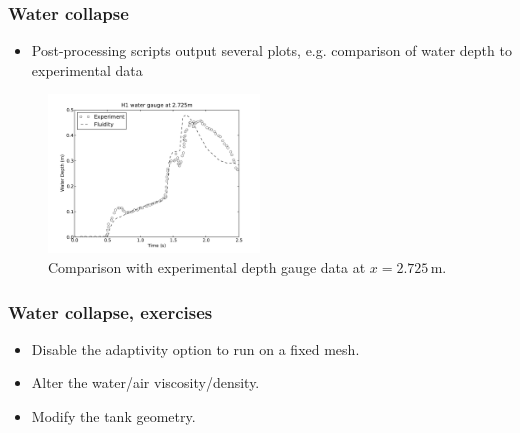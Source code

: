 %
\begin{frame}
    \frametitle{Water collapse}
\begin{itemize}
\item Post-processing scripts output several plots, e.g. comparison of water depth to experimental data
\end{itemize}
\begin{figure}
\centering
\includegraphics[width=0.5\textwidth]{./water_collapse/water_gauge_H1.pdf}
\caption{Comparison with experimental depth gauge data at $x = 2.725 \, $m.}
\end{figure}

\end{frame}
%
\begin{frame}
    \frametitle{Water collapse, exercises}
\begin{itemize}
\item Disable the adaptivity option to run on a fixed mesh.
\item Alter the water/air viscosity/density.
\item Modify the tank geometry.
\end{itemize}

\end{frame}
